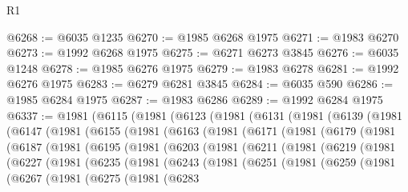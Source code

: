 \begin{lexlean}{R1}
\begin{coremodule}
@6268 := @6035 @1235
@6270 := @1985 @6268 @1975
@6271 := @1983 @6270
@6273 := @1992 @6268 @1975
@6275 := @6271 @6273 @3845
@6276 := @6035 @1248
@6278 := @1985 @6276 @1975
@6279 := @1983 @6278
@6281 := @1992 @6276 @1975
@6283 := @6279 @6281 @3845
@6284 := @6035 @590
@6286 := @1985 @6284 @1975
@6287 := @1983 @6286
@6289 := @1992 @6284 @1975
@6337 := @1981
    (@6115
      (@1981
        (@6123
          (@1981
            (@6131
              (@1981
                (@6139
                  (@1981
                    (@6147
                      (@1981
                        (@6155
                          (@1981
                            (@6163
                              (@1981
                                (@6171
                                  (@1981
                                    (@6179
                                      (@1981
                                        (@6187
                                          (@1981
                                            (@6195
                                              (@1981
                                                (@6203
                                                  (@1981
                                                    (@6211
                                                      (@1981
                                                        (@6219
                                                          (@1981
                                                            (@6227
                                                              (@1981
                                                                (@6235
                                                                  (@1981
                                                                    (@6243
                                                                      (@1981
                                                                        (@6251
                                                                          (@1981
                                                                            (@6259
                                                                              (@1981
                                                                                (@6267
                                                                                  (@1981
                                                                                    (@6275
                                                                                      (@1981
                                                                                        (@6283

\end{coremodule}
\end{lexlean}
